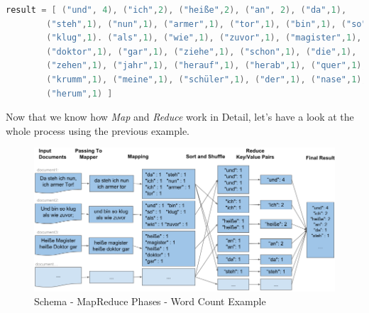 {\begin{lstlisting}[aboveskip=1ex, belowskip=3ex, xleftmargin=18pt, emphstyle=\underbar, breaklines=true, showstringspaces=false, captionpos=b, caption=MR Example - \textit{Word Count (Final Result)}, label=min_mapreduce_documents,language=java]
result = [ ("und", 4), ("ich",2), ("heiße",2), ("an", 2), ("da",1), 
		("steh",1), ("nun",1), ("armer",1), ("tor",1), ("bin",1), ("so",1), 
		("klug",1). ("als",1), ("wie",1), ("zuvor",1), ("magister",1), 
		("doktor",1), ("gar",1), ("ziehe",1), ("schon",1), ("die",1), 
		("zehen",1), ("jahr",1), ("herauf",1), ("herab",1), ("quer",1), 
		("krumm",1), ("meine",1), ("schüler",1), ("der",1), ("nase",1), 
		("herum",1) ]
\end{lstlisting}

Now that we know how \textit{Map} and \textit{Reduce} work in Detail, let's have a look at the whole process using the previous example. 

\begin{figure}[ht]
	\centering
  \includegraphics[width=1\textwidth]{map_reduce_phases_schema.png}
	\caption{Schema - MapReduce Phases - Word Count Example}
	\label{schema_map_reduce_phases_wordcount}
\end{figure}

}
